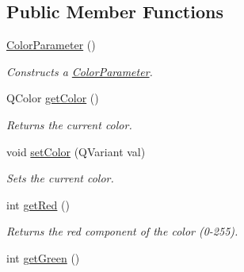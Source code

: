 \subsection*{Public Member Functions}
\begin{DoxyCompactItemize}
\item 
\hyperlink{class_picto_1_1_color_parameter_ac015cdd10c854825174c5741ab5c3949}{Color\-Parameter} ()
\begin{DoxyCompactList}\small\item\em Constructs a \hyperlink{class_picto_1_1_color_parameter}{Color\-Parameter}. \end{DoxyCompactList}\item 
\hypertarget{class_picto_1_1_color_parameter_a6bd5104402ede9cf5bafb917f097bb8f}{Q\-Color \hyperlink{class_picto_1_1_color_parameter_a6bd5104402ede9cf5bafb917f097bb8f}{get\-Color} ()}\label{class_picto_1_1_color_parameter_a6bd5104402ede9cf5bafb917f097bb8f}

\begin{DoxyCompactList}\small\item\em Returns the current color. \end{DoxyCompactList}\item 
\hypertarget{class_picto_1_1_color_parameter_a06f609b1817d8f3491e5bb424b079196}{void \hyperlink{class_picto_1_1_color_parameter_a06f609b1817d8f3491e5bb424b079196}{set\-Color} (Q\-Variant val)}\label{class_picto_1_1_color_parameter_a06f609b1817d8f3491e5bb424b079196}

\begin{DoxyCompactList}\small\item\em Sets the current color. \end{DoxyCompactList}\item 
\hypertarget{class_picto_1_1_color_parameter_af87cfdd7bf8807bf775fd5ae8a024d0e}{int \hyperlink{class_picto_1_1_color_parameter_af87cfdd7bf8807bf775fd5ae8a024d0e}{get\-Red} ()}\label{class_picto_1_1_color_parameter_af87cfdd7bf8807bf775fd5ae8a024d0e}

\begin{DoxyCompactList}\small\item\em Returns the red component of the color (0-\/255). \end{DoxyCompactList}\item 
\hypertarget{class_picto_1_1_color_parameter_aaa8c37efc4e18becc8bb7b5d4e4bcfd4}{int \hyperlink{class_picto_1_1_color_parameter_aaa8c37efc4e18becc8bb7b5d4e4bcfd4}{get\-Green} ()}\label{class_picto_1_1_color_parameter_aaa8c37efc4e18becc8bb7b5d4e4bcfd4}


\end{DoxyCompactItemize}
